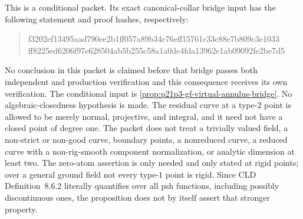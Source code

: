 \begin{remark}
\label{rem:p21p3-gfc-curve-scope}
This is a conditional packet.  Its exact canonical-collar bridge input has
the following statement and proof hashes, respectively:
\begin{quote}
\small\ttfamily
f3202ef13495aad790ee2b1ff057a89b34e76eff15761c33c88e7b809c3e1033\\
ff8225ed6206f97e628504ab5b255c58a1a0de4fda13962e1ab09092fe2be7d5
\end{quote}
No conclusion in this packet is claimed before that bridge passes both
independent and production verification and this consequence receives its
own verification.  The conditional input is
\cref{prop:p21p3-gf-virtual-annulus-bridge}.
No algebraic-closedness hypothesis is made.  The residual curve at a
type-$2$ point is allowed to be merely normal, projective, and integral,
and it need not have a closed point of degree one.  The packet does not
treat a trivially valued field, a non-strict or non-good curve, boundary
points, a nonreduced curve, a reduced curve with a non-rig-smooth component
normalization, or analytic dimension at least two.  The zero-atom assertion
is only needed and only stated at rigid points; over a general ground field
not every type-$1$ point is rigid.  Since CLD Definition~8.6.2 literally
quantifies over all psh functions, including possibly discontinuous ones,
the proposition does not by itself assert that stronger property.
\end{remark}




